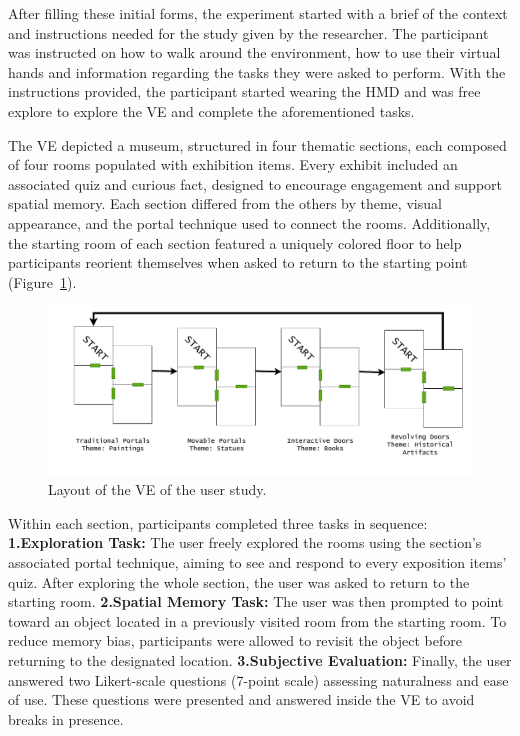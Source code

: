After filling these initial forms, the experiment started with a brief of the context and instructions needed for the study given by the 
researcher. The participant was instructed on how to walk around the environment, how to use their virtual hands and 
information regarding the tasks they were asked to perform.  With the instructions provided, the participant started wearing the 
\gls{HMD} and was free explore to explore the \gls{VE} and complete the aforementioned tasks.

The \gls{VE} depicted a museum, structured in four thematic sections, each composed of four rooms populated with exhibition items. Every 
exhibit included an associated quiz and curious fact, designed to encourage engagement and support spatial memory. Each section differed 
from the others by theme, visual appearance, and the portal technique used to connect the rooms. Additionally, the starting room of each 
section featured a uniquely colored floor to help participants reorient themselves when asked to return to the starting point 
(Figure~\ref{fig:layout}).

\begin{figure}[t]
\centering
\includegraphics[width=\linewidth]{NOVAthesisFiles/Images/schemes/layout-study.drawio.pdf}
\caption{Layout of the \gls{VE} of the user study.}
\label{fig:layout}
\end{figure}

Within each section, participants completed three tasks in sequence:  
\textbf{1.Exploration Task:} The user freely explored the rooms using the section's associated portal technique, aiming to see and respond 
to every exposition items' quiz. After exploring the whole section, the user was asked to return to the starting room.  
\textbf{2.Spatial Memory Task:} The user was then prompted to point toward an object located in a previously visited room from the starting room. 
To reduce memory bias, participants were allowed to revisit the object before returning to the designated location.  
\textbf{3.Subjective Evaluation:} Finally, the user answered two Likert-scale questions (7-point scale) assessing naturalness and ease 
of use. These questions were presented and answered inside the \gls{VE} to avoid breaks in presence.  

